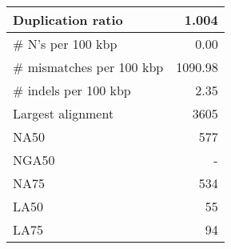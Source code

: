 \documentclass[12pt,a4paper]{article}
\begin{document}
\begin{table}[ht]
\begin{center}
\begin{tabular}{|l*{1}{|r}|}
Duplication ratio & 1.004 \\ \hline
\# N's per 100 kbp & 0.00 \\ \hline
\# mismatches per 100 kbp & 1090.98 \\ \hline
\# indels per 100 kbp & 2.35 \\ \hline
Largest alignment & 3605 \\ \hline
NA50 & 577 \\ \hline
NGA50 & - \\ \hline
NA75 & 534 \\ \hline
LA50 & 55 \\ \hline
LA75 & 94 \\ \hline
\end{tabular}
\end{center}
\end{table}
\end{document}
